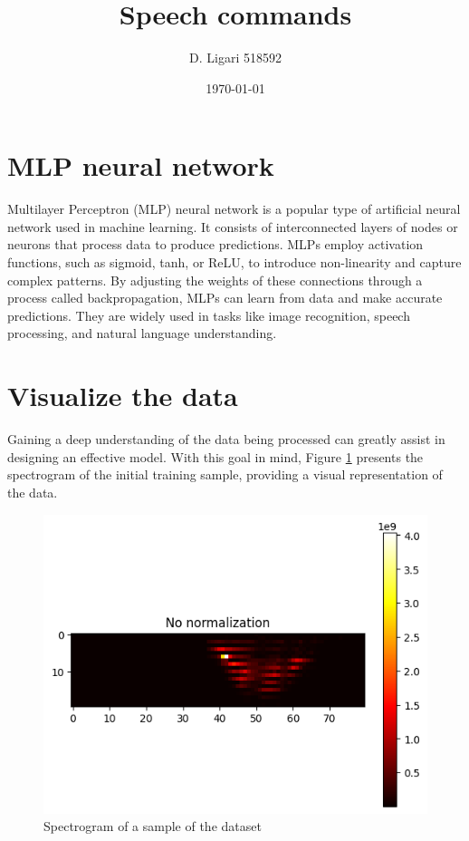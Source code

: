 \documentclass{class}
\title{Speech commands}
\author[1]{D. Ligari 518592}
\affil[1]{Machine Learning course, University of Pavia, Department of Computer Engineering (Data Science), Pavia, Italy}
\date{\today}
\begin{document}
\maketitle
\thispagestyle{FirstPage}
\section{MLP neural network}
Multilayer Perceptron (MLP) neural network is a popular type of artificial neural network used in machine learning.
It consists of interconnected layers of nodes or neurons that process data to produce predictions.
MLPs employ activation functions, such as sigmoid, tanh, or ReLU, to introduce non-linearity and capture complex patterns.
By adjusting the weights of these connections through a process called backpropagation, MLPs can learn from data and make accurate predictions.
They are widely used in tasks like image recognition, speech processing, and natural language understanding.

\section{Visualize the data}
Gaining a deep understanding of the data being processed can greatly assist in designing an effective model.
With this goal in mind, Figure \ref{fig-1} presents the spectrogram of the initial training sample, providing a visual representation of the data.

\begin{figure}[H]
    \centering
    \includegraphics[width=.6\columnwidth]{images/sample_spectrogram.png}
    \caption{Spectrogram of a sample of the dataset}
    \label{fig-1}
\end{figure}
\end{document}
